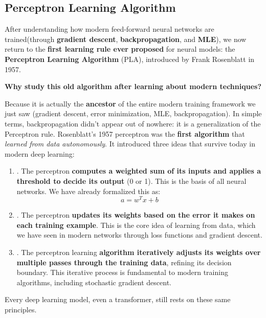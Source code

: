 \subsection{Perceptron Learning Algorithm}

After understanding how modern feed-forward neural networks are trained\break (through \textbf{gradient descent}, \textbf{backpropagation}, and \textbf{MLE}), we now return to the \textbf{first learning rule ever proposed} for neural models: the \textbf{Perceptron Learning Algorithm} (PLA), introduced by Frank Rosenblatt in 1957.

\highspace
\begin{flushleft}
    \textcolor{Green3}{ \textbf{Why study this old algorithm after learning about modern techniques?}}
\end{flushleft}
Because it is actually the \textbf{ancestor} of the entire modern training framework we just saw (gradient descent, error minimization, MLE, backpropagation). In simple terms, backpropagation didn't appear out of nowhere: it is a generalization of the Perceptron rule. Rosenblatt's 1957 perceptron was the \textbf{first algorithm} that \emph{learned from data autonomously}. It introduced three ideas that survive today in modern deep learning:
\begin{enumerate}
    \item {}. The perceptron \textbf{computes a weighted sum of its inputs and applies a threshold to decide its output} (0 or 1). This is the basis of all neural networks. We have already formalized this as:
    \begin{equation*}
        a = w^{T} x + b
    \end{equation*}

    \item {}. The perceptron \textbf{updates its weights based on the error it makes on each training example}. This is the core idea of learning from data, which we have seen in modern networks through loss functions and gradient descent.

    \item {}. The perceptron learning \textbf{algorithm iteratively adjusts its weights over multiple passes through the training data}, refining its decision boundary. This iterative process is fundamental to modern training algorithms, including stochastic gradient descent.
\end{enumerate}
Every deep learning model, even a transformer, still rests on these same principles.

